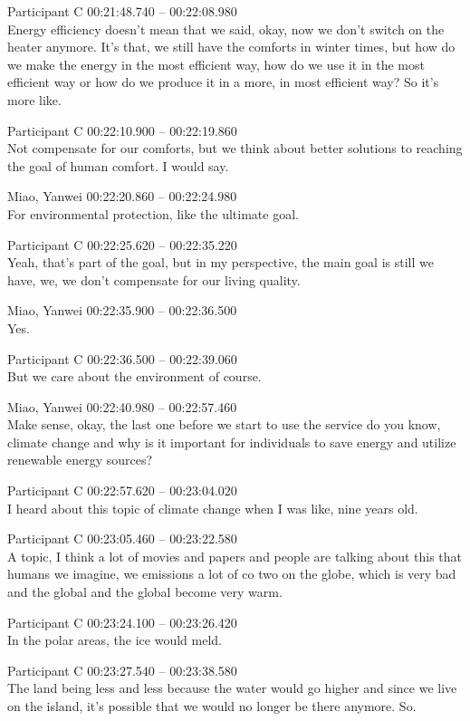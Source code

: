 {Participant C 00:21:48.740 -- 00:22:08.980 \\
Energy efficiency doesn't mean that we said, okay, now we don't switch on the heater anymore. It's that, we still have the comforts in winter times, but how do we make the energy in the most efficient way, how do we use it in the most efficient way or how do we produce it in a more, in most efficient way? So it's more like.

Participant C 00:22:10.900 -- 00:22:19.860 \\
Not compensate for our comforts, but we think about better solutions to reaching the goal of human comfort. I would say.

Miao, Yanwei 00:22:20.860 -- 00:22:24.980 \\
For environmental protection, like the ultimate goal.

Participant C 00:22:25.620 -- 00:22:35.220 \\
Yeah, that's part of the goal, but in my perspective, the main goal is still we have, we, we don't compensate for our living quality.

Miao, Yanwei 00:22:35.900 -- 00:22:36.500 \\
Yes.

Participant C 00:22:36.500 -- 00:22:39.060 \\
But we care about the environment of course.

Miao, Yanwei 00:22:40.980 -- 00:22:57.460 \\
Make sense, okay, the last one before we start to use the service do you know, climate change and why is it important for individuals to save energy and utilize renewable energy sources?

Participant C 00:22:57.620 -- 00:23:04.020 \\
I heard about this topic of climate change when I was like, nine years old.

Participant C 00:23:05.460 -- 00:23:22.580 \\
A topic, I think a lot of movies and papers and people are talking about this that humans we imagine, we emissions a lot of co two on the globe, which is very bad and the global and the global become very warm.

Participant C 00:23:24.100 -- 00:23:26.420 \\
In the polar areas, the ice would meld.

Participant C 00:23:27.540 -- 00:23:38.580 \\
The land being less and less because the water would go higher and since we live on the island, it's possible that we would no longer be there anymore. So.

}

